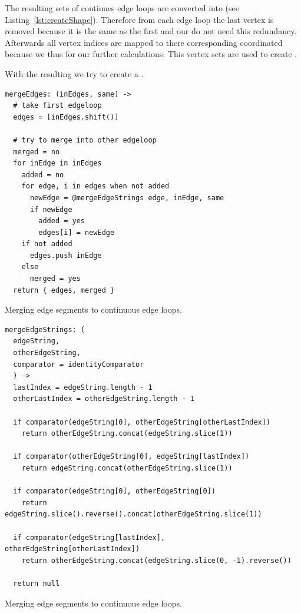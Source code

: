 \documentclass[../ClassicThesis.tex]{subfiles}
\begin{document}
The resulting sets of continues edge loops are converted into  (see Listing~\ref{lst:createShape}). Therefore from each edge loop the last vertex is removed because it is the same as the first and our  do not need this redundancy. Afterwards all vertex indices are mapped to there corresponding coordinated because we thus for our further calculations. This vertex sets are used to create .

With the resulting  we try to create a . 


\begin{listing}
\begin{verbatim}
mergeEdges: (inEdges, same) ->
  # take first edgeloop
  edges = [inEdges.shift()]

  # try to merge into other edgeloop
  merged = no
  for inEdge in inEdges
    added = no
    for edge, i in edges when not added
      newEdge = @mergeEdgeStrings edge, inEdge, same
      if newEdge
        added = yes
        edges[i] = newEdge
    if not added
      edges.push inEdge
    else
      merged = yes
  return { edges, merged }
\end{verbatim}
\caption{Merging edge segments to continuous edge loops.}
\label{lst:mergeEdges}
\end{listing}

\begin{listing}
\begin{verbatim}
mergeEdgeStrings: (
  edgeString,
  otherEdgeString,
  comparator = identityComparator
  ) ->
  lastIndex = edgeString.length - 1
  otherLastIndex = otherEdgeString.length - 1

  if comparator(edgeString[0], otherEdgeString[otherLastIndex])
    return otherEdgeString.concat(edgeString.slice(1))

  if comparator(otherEdgeString[0], edgeString[lastIndex])
    return edgeString.concat(otherEdgeString.slice(1))

  if comparator(edgeString[0], otherEdgeString[0])
    return edgeString.slice().reverse().concat(otherEdgeString.slice(1))

  if comparator(edgeString[lastIndex], otherEdgeString[otherLastIndex])
    return otherEdgeString.concat(edgeString.slice(0, -1).reverse())

  return null
\end{verbatim}
\caption{Merging edge segments to continuous edge loops.}
\label{lst:mergeEdgeStrings}
\end{listing}
\end{document}
